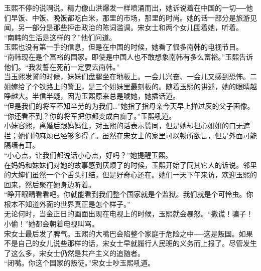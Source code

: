 玉熙不停的说啊说。精力像山洪爆发一样喷涌而出，她诉说着在中国的一切──他们早饭、中饭、晚饭都吃白米，那里的市场，那里的时尚。她的话一部分是旅游见闻，另一部分是那些抨击政治的陈词滥调。宋女士和两个女儿围着她，听着。\\

“南韩的生活是这样的？”他们问道。\\

玉熙也没有第一手的信息，但是在中国的时候，她看了很多南韩的电视节目。\\

“南韩现在是个富裕的国家。即使是中国人也不敢想象南韩有多么富裕。”玉熙告诉他们。“我发誓在死前一定要去南韩。”\\

当玉熙发誓的时候，妹妹们盘腿坐在地板上。一会儿兴奋、一会儿又感到恐怖。二姐嫁给了个铁路上的警卫，是三个姐妹里最刻板的。随着玉熙的讲述，她的眼睛越睁越大。半信半疑，因为玉熙原来总是唬她，她插话道。\\

“但是我们的将军不知辛劳的为我们…”她指了指母亲今天早上掸过灰的父子画像。\\

“你还看不到？你的将军把你都变成白痴了。”玉熙吼道。\\

小妹容熙，离婚后跟妈妈住，对玉熙的话表示赞同，但是她却担心姐姐的口无遮拦；她们的麻烦已经够多得了。虽然在宋女士的家里可以畅所欲言，但是外面可能隔墙有耳。\\

“小心点，让我们都说话小心点，好吗？”她提醒玉熙。\\

在妈妈和妹妹们对她的故事感到厌烦了的时候，玉熙开始了同其它人的诉说。邻里的大婶们虽然一个个舌头打结，但是好奇心还在。她们一天下午来访，欢迎玉熙的回来，然后聚在她身边听着。\\

“睁开眼睛看看吧。你就能看到我们整个国家就是个监狱。我们就是个可怜虫。你根本不知道外面的世界真正是怎个样子。”\\

无论何时，当金正日的画面出现在电视上的时候，玉熙就会暴怒。“撒谎！骗子！小偷！”她都会朝着电视叫骂。\\

宋女士最后发了脾气。玉熙的大嘴巴会陷整个家庭于危险之中──这是叛国。如果不是自己的女儿说些那样的话，宋女士早就履行人民班的义务而上报了。尽管发生了这么多，宋女士仍然是共产主义的追随者。\\

“闭嘴。你这个国家的叛徒。”宋女士吵玉熙吼道。\\

